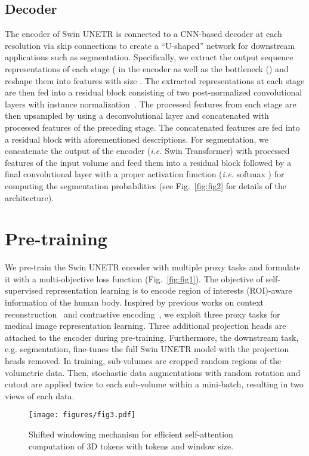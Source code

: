 \documentclass[10pt,twocolumn,letterpaper]{article}
\begin{document}
\subsection{Decoder}
The encoder of Swin UNETR is connected to a CNN-based decoder at each resolution via skip connections to create a ``U-shaped'' network for downstream applications such as segmentation. Specifically, we extract the output sequence representations of each stage  ( in the encoder as well as the bottleneck () and reshape them into features with size  . The extracted representations at each stage are then fed into a residual block consisting of two post-normalized  convolutional layers with instance normalization~\cite{ulyanov2016instance}. The processed features from each stage are then upsampled by using a deconvolutional layer and concatenated with processed features of the preceding stage. The concatenated features are fed into a residual block with aforementioned descriptions. For segmentation, we concatenate the output of the encoder (\textit{i.e.} Swin Transformer) with processed features of the input volume and feed them into a residual block followed by a final  convolutional layer with a proper activation function (\textit{i.e.} softmax ) for computing the segmentation probabilities (see Fig.~\ref{fig:fig2} for details of the architecture). 

\section{Pre-training}
We pre-train the Swin UNETR encoder with multiple proxy tasks and formulate it with a multi-objective loss function (Fig.~\ref{fig:fig1}).
The objective of self-supervised representation learning is to encode region of interests (ROI)-aware information of the human body. Inspired by previous works on context reconstruction~\cite{zhou2021models, haghighi2021transferable} and contrastive encoding~\cite{he2020momentum}, we exploit three proxy tasks for medical image representation learning. Three additional projection heads are attached to the encoder during pre-training. Furthermore, the downstream task, e.g. segmentation, fine-tunes the full Swin UNETR model with the projection heads removed. In training, sub-volumes are cropped random regions of the volumetric data. Then, stochastic data augmentations with random rotation and cutout are applied twice to each sub-volume within a mini-batch, resulting in two views of each data.
\begin{figure}[t]
\texttt{[image: figures/fig3.pdf]}
\caption{Shifted windowing mechanism for efficient self-attention computation of 3D tokens with  tokens and  window size.}
  \label{fig:fig3}
\end{figure}
\end{document}
